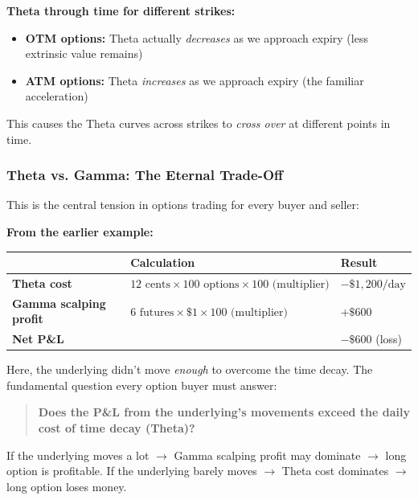 \documentclass[12pt,openany]{book}
\begin{document}
\textbf{Theta through time for different strikes:}
\begin{itemize}[leftmargin=*]
    \item \textbf{OTM options:} Theta actually \emph{decreases} as we approach expiry (less extrinsic value remains)
    \item \textbf{ATM options:} Theta \emph{increases} as we approach expiry (the familiar acceleration)
\end{itemize}

This causes the Theta curves across strikes to \emph{cross over} at different points in time.

\subsubsection{Theta vs. Gamma: The Eternal Trade-Off}

This is the central tension in options trading for every buyer and seller:

\textbf{From the earlier example:}
\begin{center}
\scriptsize
\setlength{\tabcolsep}{3pt}
\begin{tabular}{|L{4.1cm}|L{4.1cm}|L{4.1cm}|}
\hline
\textbf{} & \textbf{Calculation} & \textbf{Result} \\
\hline
\textbf{Theta cost} & \(12 \text{ cents} \times 100 \text{ options} \times 100 \text{ (multiplier)}\) & \(-\$1,200/\text{day}\) \\
\hline
\textbf{Gamma scalping profit} & \(6 \text{ futures} \times \$1 \times 100 \text{ (multiplier)}\) & \(+\$600\) \\
\hline
\textbf{Net P\&L} &  & \(-\$600\) (loss) \\
\hline
\end{tabular}
\end{center}

Here, the underlying didn't move \emph{enough} to overcome the time decay. The fundamental question every option buyer must answer:

\begin{quote}
\textbf{Does the P\&L from the underlying's movements exceed the daily cost of time decay (Theta)?}
\end{quote}

If the underlying moves a lot \(\rightarrow\) Gamma scalping profit may dominate \(\rightarrow\) long option is profitable.
If the underlying barely moves \(\rightarrow\) Theta cost dominates \(\rightarrow\) long option loses money.
\end{document}
